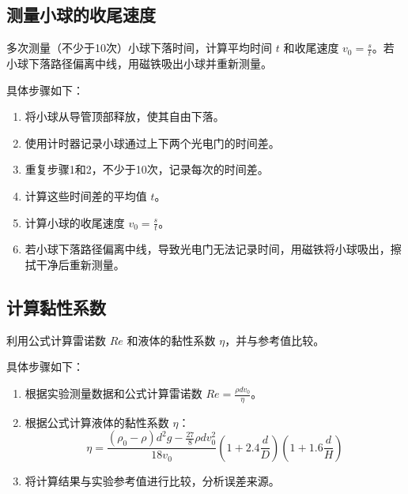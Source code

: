 \documentclass[UTF8]{ctexart}
\begin{document}
\subsection{测量小球的收尾速度}
多次测量（不少于10次）小球下落时间，计算平均时间 \(t\) 和收尾速度 \(v_0 = \frac{s}{t}\)。若小球下落路径偏离中线，用磁铁吸出小球并重新测量。

具体步骤如下：
\begin{enumerate}
    \item 将小球从导管顶部释放，使其自由下落。
    \item 使用计时器记录小球通过上下两个光电门的时间差。
    \item 重复步骤1和2，不少于10次，记录每次的时间差。
    \item 计算这些时间差的平均值 \(t\)。
    \item 计算小球的收尾速度 \(v_0 = \frac{s}{t}\)。
    \item 若小球下落路径偏离中线，导致光电门无法记录时间，用磁铁将小球吸出，擦拭干净后重新测量。
\end{enumerate}

\subsection{计算黏性系数}
利用公式计算雷诺数 \(Re\) 和液体的黏性系数 \(\eta\)，并与参考值比较。

具体步骤如下：
\begin{enumerate}
    \item 根据实验测量数据和公式计算雷诺数 \(Re = \frac{\rho d v_0}{\eta}\)。
    \item 根据公式计算液体的黏性系数 \(\eta\)：
    \[
    \eta = \frac{(\rho_0 - \rho) d^2 g - \frac{27}{8} \rho d v_0^2}{18 v_0} \left(1 + 2.4 \frac{d}{D}\right) \left(1 + 1.6 \frac{d}{H}\right)
    \]
    \item 将计算结果与实验参考值进行比较，分析误差来源。
\end{enumerate}





\end{document}
